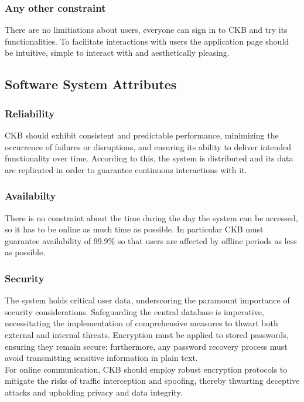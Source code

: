 \vspace{20pt}

\subsubsection{Any other constraint}

There are no limitiations about users, everyone can sign in to CKB and try its functionalities. To facilitate interactions with users the application page should be intuitive, simple to interact with and aesthetically pleasing.


\newpage

\subsection{Software System Attributes}

\vspace{20pt}

\subsubsection{Reliability}

CKB should exhibit consistent and predictable performance, minimizing the occurrence of failures or disruptions, and ensuring its ability to deliver intended functionality over time.
According to this, the system is distributed and its data are replicated in order to guarantee continuous interactions with it.  

\vspace{20pt}

\subsubsection{Availabilty}

There is no constraint about the time during the day the system can be accessed, so it has to be online as much time as possible. In particular CKB must guarantee availability of 99.9\% so that users are affected by offline periods as less as possible.

\vspace{20pt}

\subsubsection{Security}

The system holds critical user data, underscoring the paramount importance of security considerations. Safeguarding the central database is imperative, necessitating the implementation of comprehensive measures to thwart both external and internal threats. Encryption must be applied to stored passwords, ensuring they remain secure; furthermore, any password recovery process must avoid transmitting sensitive information in plain text. \\For online communication, CKB should employ robust encryption protocols to mitigate the risks of traffic interception and spoofing, thereby thwarting deceptive attacks and upholding privacy and data integrity.

